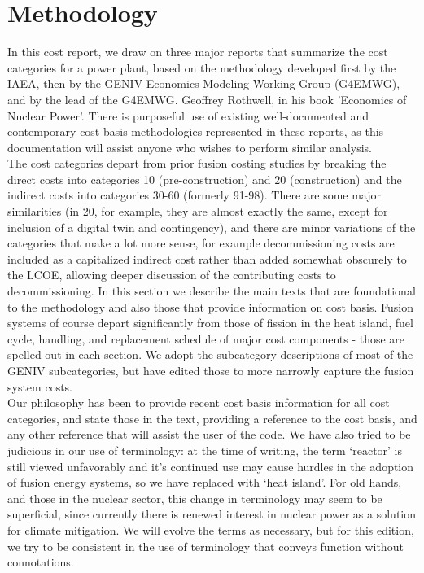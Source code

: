 
\section{Methodology} 

In this cost report, we draw on three major reports that summarize the cost categories for a power plant, based on the methodology developed first by the IAEA, then by the GENIV Economics Modeling Working Group (G4EMWG), and by the lead of the G4EMWG. Geoffrey Rothwell, in his book 'Economics of Nuclear Power'.  There is purposeful use of existing well-documented and contemporary cost basis methodologies represented in these reports, as this documentation will assist anyone who wishes to perform similar analysis.\\

The cost categories depart from prior fusion costing studies by breaking the direct costs into categories 10 (pre-construction) and 20 (construction) and the indirect costs into categories 30-60 (formerly 91-98).  There are some major similarities (in 20, for example, they are almost exactly the same, except for inclusion of a digital twin and contingency), and there are minor variations of the categories that make a lot more sense, for example decommissioning costs are included as a capitalized indirect cost rather than added somewhat obscurely to the LCOE, allowing deeper discussion of the contributing costs to decommissioning.  In this section we describe the main texts that are foundational to the methodology and also those that provide information on cost basis.  Fusion systems of course depart significantly from those of fission in the heat island, fuel cycle, handling, and replacement schedule of major cost components - those are spelled out in each section.  We adopt the subcategory descriptions of most of the GENIV subcategories, but have edited those to more narrowly capture the fusion system costs.\\  

Our philosophy has been to provide recent cost basis information for all cost categories, and state those in the text, providing a reference to the cost basis, and any other reference that will assist the user of the code.  We have also tried to be judicious in our use of terminology: at the time of writing, the term `reactor' is still viewed unfavorably and it's continued use may cause hurdles in the adoption of fusion energy systems, so we have replaced with `heat island'.  For old hands, and those in the nuclear sector, this change in terminology may seem to be superficial, since currently there is renewed interest in nuclear power as a solution for climate mitigation.  We will evolve the terms as necessary, but for this edition, we try to be consistent in the use of terminology that conveys function without connotations.

